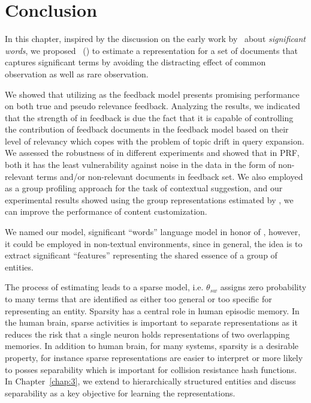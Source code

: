 



\section{Conclusion} 
In this chapter, inspired by the discussion on the early work by~\citet{Luhn:1958} about \emph{significant words}, we proposed \emph{\swlms}\ (\acswlm) to estimate a representation for a set of documents that captures significant terms by avoiding the distracting effect of common observation as well as rare observation.

We showed that utilizing \acswlm as the feedback model presents promising performance on both true and pseudo relevance feedback. Analyzing the results, we indicated that the strength of \acswlm in feedback is due the fact that it is capable of controlling the contribution of feedback documents in the feedback model based on their level of relevancy which copes with the problem of topic drift in query expansion. We assessed the robustness of \acswlm in different experiments and showed that in PRF, both it has the least vulnerability against noise in the data in the form of non-relevant terms and/or non-relevant documents in feedback set.
%
We also employed \acswlm as a group profiling approach for the task of contextual suggestion, and our experimental results showed using the group representations estimated by \acswlm, we can improve the performance of content customization. 

We named our model, significant ``words'' language model in honor of \citeauthor{Luhn:1958}, however, it could be employed in non-textual environments, since in general, the idea is to extract significant ``features'' representing the shared essence of a group of entities.

The process of estimating \acswlm leads to a sparse model, i.e. $\theta_{sw}$ assigns zero probability to many terms that are identified as either too general or too specific for representing an entity. 
Sparsity has a central role in human episodic memory. In the human brain, sparse activities is important to separate representations as it reduces the risk that a single neuron holds representations of two overlapping memories\citep{cho2018blockchain}. In addition to human brain, for many systems, sparsity is a desirable property, for instance sparse representations are easier to interpret or more likely to posses separability which is important for collision resistance hash functions. 
In Chapter~\ref{chap:3}, we extend \acswlm to hierarchically structured entities and discuss separability as a key objective for learning the representations.
